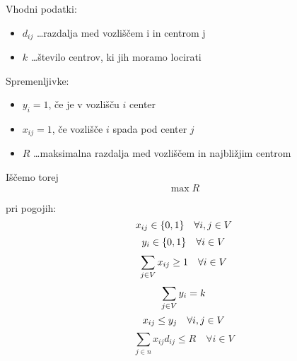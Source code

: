 \documentclass{article}
\begin{document}
Vhodni podatki:
\begin{itemize}
\item{$d_{ij}$ \dots razdalja med vozliščem i in centrom j}
\item{$k$ \dots število centrov, ki jih moramo locirati}
\end{itemize}

Spremenljivke:
\begin{itemize}
\item{$y_{i}=1$, če je v vozlišču $i$ center}
\item{$x_{ij}= 1$, če vozlišče $i$ spada pod center $j$}
\item{$R$ \dots maksimalna razdalja med vozliščem in najbližjim centrom}
\end{itemize}

\cleardoublepage

Iščemo torej\\
$$\max R$$

pri pogojih:
$$x_{ij} \in \{0,1\} \quad\forall i,j \in V\\$$
$$y_{i} \in \{0,1\} \quad\forall i \in V \\$$
$$\sum_{j \in V} x_{ij} \geq 1 \quad \forall i \in V \\$$
$$\sum_{j \in V} y_{i} = k \\$$
$$x_{ij} \leq y_{j} \quad \forall i,j \in V \\$$
$$\sum_{j \in n} x_{ij} d_{ij} \leq R \quad\forall i \in V $$


\end{document}
